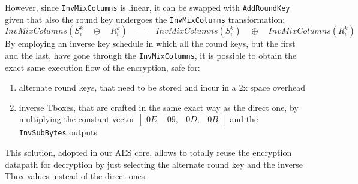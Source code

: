 However, since \texttt{InvMixColumns} is linear, it can be swapped with \texttt{AddRoundKey} given
that also the round key undergoes the \texttt{InvMixColumns} transformation:
\begin{equation}
  InvMixColumns(S^k_i\quad \oplus\quad R^k_i)\quad = \quad InvMixColumns(S^k_i)\quad \oplus\quad InvMixColumns(R^k_i)
  \label{eq:tbox}
\end{equation}
By employing an inverse key schedule in which all the round keys, but the first and the
last, have gone through the \texttt{InvMixColumns}, it is possible to obtain the exact same
execution flow of the encryption, safe for:
\begin{enumerate}
  \item alternate round keys, that need to be stored and incur in a 2x space overhead
  \item inverse Tboxes, that are crafted in the same exact way as the direct one,
by multiplying the constant vector
$\begin{bmatrix} 0E , & 09 , & 0D , & 0B \end{bmatrix}$ and
the \texttt{InvSubBytes} outputs
\end{enumerate}

This solution, adopted in our AES core, allows to totally reuse the encryption datapath
for decryption by just selecting the alternate round key and the inverse
Tbox values instead of the direct ones.
